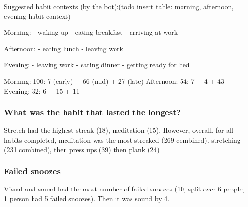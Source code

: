 \documentclass{scaffold/sigchi}
\begin{document}
Suggested habit contexts (by the bot):(todo insert table: morning, afternoon, evening habit context)

Morning:
  - waking up
  - eating breakfast
  - arriving at work

  Afternoon:
  - eating lunch
  - leaving work

  Evening:
  - leaving work
  - eating dinner
  - getting ready for bed

  Morning: 100: 7 (early) + 66 (mid) + 27 (late)
  Afternoon: 54: 7 + 4 + 43
  Evening: 32: 6 + 15 + 11



\subsubsection{What was the habit that lasted the longest?}
Stretch had the highest streak (18), meditation (15). However, overall, for all habits completed, meditation was the most streaked (269 combined), stretching (231 combined), then press ups (39) then plank (24)

\subsubsection{Failed snoozes}
Visual and sound had the most number of failed snoozes (10, split over 6 people, 1 person had 5 failed snoozes). Then it was sound by 4.







\end{document}
